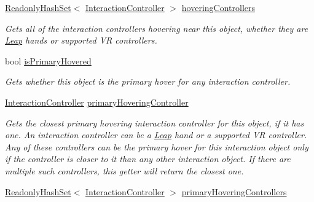\begin{DoxyCompactItemize}
\mbox{\hyperlink{struct_leap_1_1_unity_1_1_readonly_hash_set}{Readonly\+Hash\+Set}}$<$ \mbox{\hyperlink{class_leap_1_1_unity_1_1_interaction_1_1_interaction_controller}{Interaction\+Controller}} $>$ \mbox{\hyperlink{class_leap_1_1_unity_1_1_interaction_1_1_interaction_behaviour_a0736f94902d69e2cd6d18cec54a1ffb6}{hovering\+Controllers}}
\begin{DoxyCompactList}\small\item\em Gets all of the interaction controllers hovering near this object, whether they are \mbox{\hyperlink{namespace_leap_1_1_unity_1_1_leap}{Leap}} hands or supported VR controllers. \end{DoxyCompactList}\item 
bool \mbox{\hyperlink{class_leap_1_1_unity_1_1_interaction_1_1_interaction_behaviour_a6648c4fe010dec0193cc5ce80a8907fb}{is\+Primary\+Hovered}}
\begin{DoxyCompactList}\small\item\em Gets whether this object is the primary hover for any interaction controller. \end{DoxyCompactList}\item 
\mbox{\hyperlink{class_leap_1_1_unity_1_1_interaction_1_1_interaction_controller}{Interaction\+Controller}} \mbox{\hyperlink{class_leap_1_1_unity_1_1_interaction_1_1_interaction_behaviour_a234b0a5dc3391758b1e423ae5006c572}{primary\+Hovering\+Controller}}
\begin{DoxyCompactList}\small\item\em Gets the closest primary hovering interaction controller for this object, if it has one. An interaction controller can be a \mbox{\hyperlink{namespace_leap_1_1_unity_1_1_leap}{Leap}} hand or a supported VR controller. Any of these controllers can be the primary hover for this interaction object only if the controller is closer to it than any other interaction object. If there are multiple such controllers, this getter will return the closest one. \end{DoxyCompactList}\item 
\mbox{\hyperlink{struct_leap_1_1_unity_1_1_readonly_hash_set}{Readonly\+Hash\+Set}}$<$ \mbox{\hyperlink{class_leap_1_1_unity_1_1_interaction_1_1_interaction_controller}{Interaction\+Controller}} $>$ \mbox{\hyperlink{class_leap_1_1_unity_1_1_interaction_1_1_interaction_behaviour_a9e3910dd8d02adadb5c2a85401052f42}{primary\+Hovering\+Controllers}}

\end{DoxyCompactItemize}
